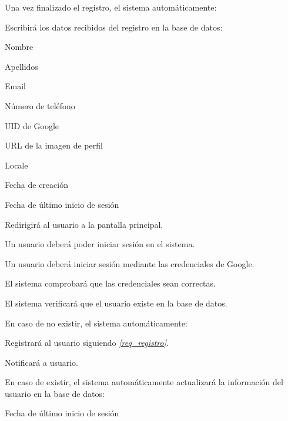 \begin{myEnumerate}
\begin{myEnumerate}
   	\item Una vez finalizado el registro, el sistema automáticamente:
   		\begin{myEnumerate}
   		\item Escribirá los datos recibidos del registro en la base de datos:
    		\begin{myEnumerate}
      			\item Nombre
      			\item Apellidos
      			\item Email
      			\item Número de teléfono
      			\item UID de Google
      			\item URL de la imagen de perfil
      			\item Locale
      			\item Fecha de creación
      			\item Fecha de último inicio de sesión
    		\end{myEnumerate}
    		
    	\item Redirigirá al usuario a la pantalla principal.
    	\end{myEnumerate}
  \end{myEnumerate}
  
  \item Un usuario deberá poder iniciar sesión en el sistema. %
    \begin{myEnumerate}%
      \item Un usuario deberá iniciar sesión mediante las credenciales de Google.
      \begin{myEnumerate}%
      	\item El sistema comprobará que las credenciales sean correctas.
      	\item El sistema verificará que el usuario existe en la base de datos.
      		\begin{myEnumerate}%
      			\item En caso de no existir, el sistema automáticamente:
      			\begin{myEnumerate}%
      				\item Registrará al usuario siguiendo \textit{\ref{req_registro}}.
      				\item Notificará a usuario.
      			\end{myEnumerate}
      			\item En caso de existir, el sistema automáticamente actualizará la información del usuario en la base de datos:
      			\begin{myEnumerate}
      				\item Fecha de último inicio de sesión
      			\end{myEnumerate}
      		\end{myEnumerate}
      \end{myEnumerate}
      

\end{myEnumerate}
\end{myEnumerate}
